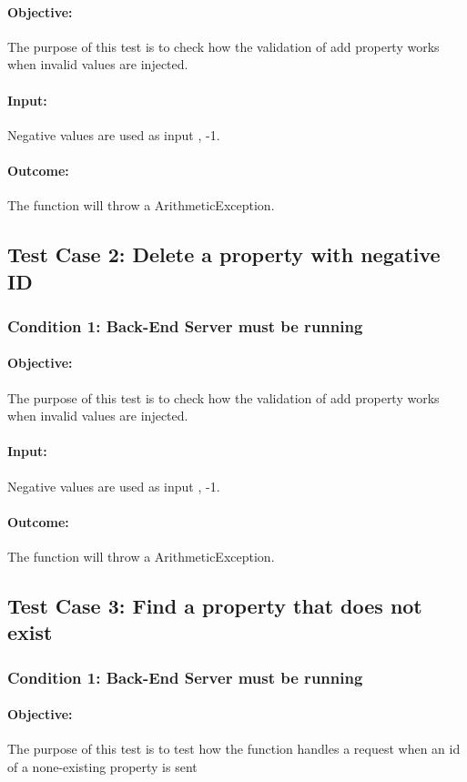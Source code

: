 \documentclass[a4paper,12pt]{article}
\begin{document}
\paragraph{Objective:}The purpose of this test is to check how the validation of add property works when invalid values are injected. 
\paragraph{Input:} Negative values are used as input , -1.
\paragraph{Outcome: } The function will throw a ArithmeticException.

\subsection{Test Case 2: Delete a property with negative ID}
\subsubsection{Condition 1: Back-End Server must be running}
\paragraph{Objective:}The purpose of this test is to check how the validation of add property works when invalid values are injected.
\paragraph{Input:} Negative values are used as input , -1.
\paragraph{Outcome: } The function will throw a ArithmeticException.

\subsection{Test Case 3: Find a property that does not exist}
\subsubsection{Condition 1: Back-End Server must be running}
\paragraph{Objective:}The purpose of this test is to test how the function handles a request when an id of a none-existing property is sent
\end{document}
